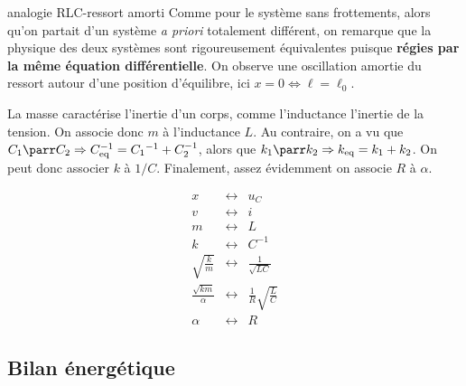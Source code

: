 \documentclass[../main/main.tex]{subfiles}
\begin{document}
\begin{rema}[label=rema:ressortlibre, sidebyside, righthand ratio=.6]{analogie
    RLC-ressort amorti}
    Comme pour le système sans frottements, alors qu'on partait d'un système
    \textit{a priori} totalement différent, on remarque que la physique des deux
    systèmes sont rigoureusement équivalentes puisque \textbf{régies par la même
    équation différentielle}. On observe une oscillation amortie du ressort
    autour d'une position d'équilibre, ici $x=0 \Leftrightarrow \ell = \ell_0$.
    \tcblower

    \begin{minipage}{0.6\linewidth}
        La masse caractérise l'inertie d'un corps, comme l'inductance l'inertie de
        la tension. On associe donc $m$ à l'inductance $L$. Au contraire, on a vu
        que $C_1 \parr C_2 \Rightarrow C_{\rm eq}^{-1} = C_1{}^{-1} + C_2^{-1}$,
        alors que $k_1 \parr k_2 \Rightarrow k_{\rm eq} = k_1 + k_2$. On peut donc
        associer $k$ à $1/C$. Finalement, assez évidemment on associe $R$ à $\alpha$.
    \end{minipage}
    \begin{minipage}{0.39\linewidth}
        \[
        \begin{array}{rlc}
            x & \longleftrightarrow & u_C\\
            v & \longleftrightarrow & i\\
            m & \longleftrightarrow & L\\
            k & \longleftrightarrow & C^{-1}\\
            \sqrt{\frac{k}{m}} & \longleftrightarrow & \frac{1}{\sqrt{LC}}\\
            \frac{\sqrt{km}}{\alpha} & \longleftrightarrow & \frac{1}{R}
            \sqrt{\frac{L}{C}}\\
            \alpha & \longleftrightarrow & R
        \end{array}
    \]
    \end{minipage}
\end{rema}

\subsection{Bilan énergétique}
\end{document}

